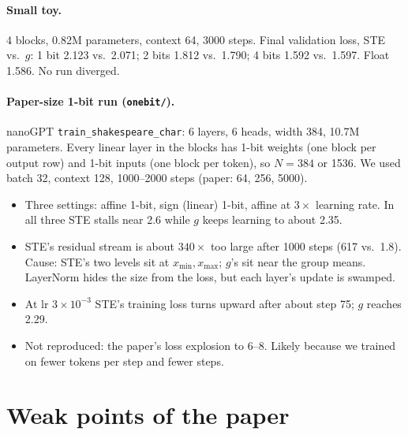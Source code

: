 \documentclass[11pt]{article}
\begin{document}
\paragraph{Small toy.} 4 blocks, 0.82M parameters, context 64, 3000 steps. Final validation loss, STE vs.\ $g$: 1 bit 2.123 vs.\ 2.071; 2 bits 1.812 vs.\ 1.790; 4 bits 1.592 vs.\ 1.597. Float 1.586. No run diverged.

\paragraph{Paper-size 1-bit run (\texttt{onebit/}).} nanoGPT \texttt{train\_shakespeare\_char}: 6 layers, 6 heads, width 384, 10.7M parameters. Every linear layer in the blocks has 1-bit weights (one block per output row) and 1-bit inputs (one block per token), so $N=384$ or 1536. We used batch 32, context 128, 1000--2000 steps (paper: 64, 256, 5000).
\begin{itemize}
\item Three settings: affine 1-bit, sign (linear) 1-bit, affine at $3\times$ learning rate. In all three STE stalls near 2.6 while $g$ keeps learning to about 2.35.
\item STE's residual stream is about $340\times$ too large after 1000 steps (617 vs.\ 1.8). Cause: STE's two levels sit at $x_{\min},x_{\max}$; $g$'s sit near the group means. LayerNorm hides the size from the loss, but each layer's update is swamped.
\item At lr $3\times10^{-3}$ STE's training loss turns upward after about step 75; $g$ reaches 2.29.
\item Not reproduced: the paper's loss explosion to 6--8. Likely because we trained on fewer tokens per step and fewer steps.
\end{itemize}

\section{Weak points of the paper}
\end{document}
